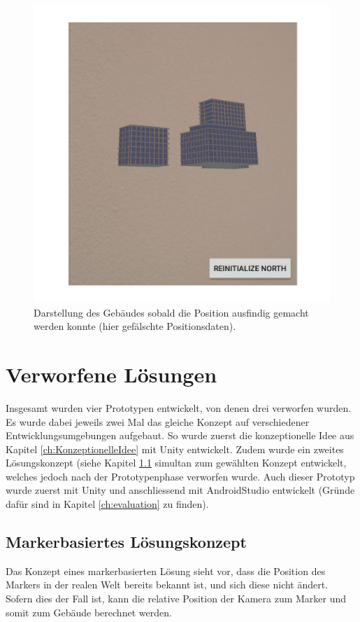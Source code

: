 \documentclass[a4paper]{scrreprt}
\begin{document}
\begin{figure}[h!]
	\includegraphics[keepaspectratio, width=\textwidth]{ARShowBuilding.png}
	\caption{Darstellung des Gebäudes sobald die Position ausfindig gemacht werden konnte (hier gefälschte Positionsdaten).}
    \label{fig:ARShowBuilding}
\end{figure}

\clearpage

\section{Verworfene Lösungen}
\label{ch:verworfeneLösungen}
Insgesamt wurden vier Prototypen entwickelt, von denen drei verworfen wurden. Es wurde dabei jeweils zwei Mal das gleiche Konzept auf verschiedener Entwicklungsumgebungen aufgebaut. So wurde zuerst die konzeptionelle Idee aus Kapitel \ref{ch:KonzeptionelleIdee} mit Unity entwickelt. Zudem wurde ein zweites Lösungskonzept (siehe Kapitel \ref{ch:markerbasiertesLoesungskonzept} simultan zum gewählten Konzept entwickelt, welches jedoch nach der Prototypenphase verworfen wurde. Auch dieser Prototyp wurde zuerst mit Unity und anschliessend mit AndroidStudio entwickelt (Gründe dafür sind in Kapitel \ref{ch:evaluation} zu finden).

\subsection{Markerbasiertes Lösungskonzept}
\label{ch:markerbasiertesLoesungskonzept}
Das Konzept eines markerbasierten Lösung sieht vor, dass die Position des Markers in der realen Welt bereits bekannt ist, und sich diese nicht ändert. Sofern dies der Fall ist, kann die relative Position der Kamera zum Marker und somit zum Gebäude berechnet werden.
\end{document}
